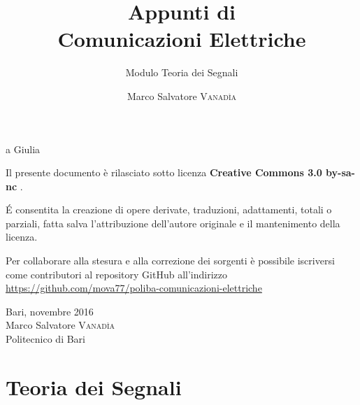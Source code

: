 \documentclass[10pt,a4paper,onecolumn,titlepage,twoside,openright,final]{book}
\title{Appunti di \\ Comunicazioni Elettriche}
\subtitle{Modulo Teoria dei Segnali}
\author{Marco Salvatore \textsc{Vanadìa}}
\begin{document}
\frontmatter
\maketitle

\null{}
\begin{flushright}a Giulia\end{flushright}
\null
\vfill
Il presente documento è rilasciato sotto licenza \ccLogo \textbf{Creative Commons 3.0 by-sa-nc} \ccbyncsa.

\'{E} consentita la creazione di opere derivate, traduzioni, adattamenti, totali o parziali, fatta salva l'attribuzione dell'autore originale e il mantenimento della licenza.

Per collaborare alla stesura e alla correzione dei sorgenti è possibile iscriversi come contributori al repository GitHub all'indirizzo \url{https://github.com/mova77/poliba-comunicazioni-elettriche}

Bari, novembre 2016 \\ Marco Salvatore \textsc{Vanadìa}\\Politecnico di Bari
\cleardoublepage\clearpage{\pagestyle{empty}\cleardoublepage}

\tableofcontents

\mainmatter

\part{Teoria dei Segnali}











{}

\printindex

%
\end{document}

